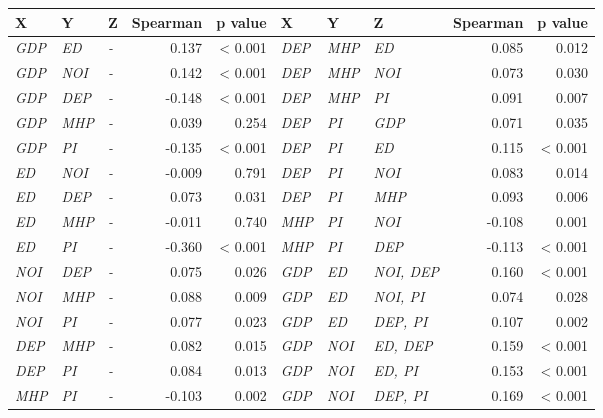 \begin{tabular}{lllrr|lllrr}
\toprule
X & Y & Z & Spearman & p value & X & Y & Z & Spearman & p value \\
\midrule
\textit{GDP} & \textit{ED} & \textit{-} & 0.137 & \textless{} 0.001 & \textit{DEP} & \textit{MHP} & \textit{ED} & 0.085 & 0.012 \\
\textit{GDP} & \textit{NOI} & \textit{-} & 0.142 & \textless{} 0.001 & \textit{DEP} & \textit{MHP} & \textit{NOI} & 0.073 & 0.030 \\
\textit{GDP} & \textit{DEP} & \textit{-} & -0.148 & \textless{} 0.001 & \textit{DEP} & \textit{MHP} & \textit{PI} & 0.091 & 0.007 \\
\textit{GDP} & \textit{MHP} & \textit{-} & 0.039 & 0.254 & \textit{DEP} & \textit{PI} & \textit{GDP} & 0.071 & 0.035 \\
\textit{GDP} & \textit{PI} & \textit{-} & -0.135 & \textless{} 0.001 & \textit{DEP} & \textit{PI} & \textit{ED} & 0.115 & \textless{} 0.001 \\
\textit{ED} & \textit{NOI} & \textit{-} & -0.009 & 0.791 & \textit{DEP} & \textit{PI} & \textit{NOI} & 0.083 & 0.014 \\
\textit{ED} & \textit{DEP} & \textit{-} & 0.073 & 0.031 & \textit{DEP} & \textit{PI} & \textit{MHP} & 0.093 & 0.006 \\
\textit{ED} & \textit{MHP} & \textit{-} & -0.011 & 0.740 & \textit{MHP} & \textit{PI} & \textit{NOI} & -0.108 & 0.001 \\
\textit{ED} & \textit{PI} & \textit{-} & -0.360 & \textless{} 0.001 & \textit{MHP} & \textit{PI} & \textit{DEP} & -0.113 & \textless{} 0.001 \\
\textit{NOI} & \textit{DEP} & \textit{-} & 0.075 & 0.026 & \textit{GDP} & \textit{ED} & \textit{NOI, DEP} & 0.160 & \textless{} 0.001 \\
\textit{NOI} & \textit{MHP} & \textit{-} & 0.088 & 0.009 & \textit{GDP} & \textit{ED} & \textit{NOI, PI} & 0.074 & 0.028 \\
\textit{NOI} & \textit{PI} & \textit{-} & 0.077 & 0.023 & \textit{GDP} & \textit{ED} & \textit{DEP, PI} & 0.107 & 0.002 \\
\textit{DEP} & \textit{MHP} & \textit{-} & 0.082 & 0.015 & \textit{GDP} & \textit{NOI} & \textit{ED, DEP} & 0.159 & \textless{} 0.001 \\
\textit{DEP} & \textit{PI} & \textit{-} & 0.084 & 0.013 & \textit{GDP} & \textit{NOI} & \textit{ED, PI} & 0.153 & \textless{} 0.001 \\
\textit{MHP} & \textit{PI} & \textit{-} & -0.103 & 0.002 & \textit{GDP} & \textit{NOI} & \textit{DEP, PI} & 0.169 & \textless{} 0.001 \\

\end{tabular}
